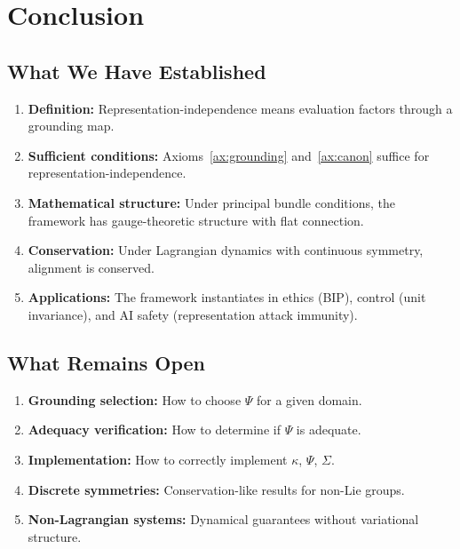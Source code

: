 \documentclass[12pt]{article}
\theoremstyle{definition}
\theoremstyle{remark}
\begin{document}
\section{Conclusion}

\subsection{What We Have Established}

\begin{enumerate}
    \item \textbf{Definition:} Representation-independence means evaluation factors through a grounding
    map.
    \item \textbf{Sufficient conditions:} Axioms~\ref{ax:grounding} and~\ref{ax:canon} suffice for representation-independence.
    \item \textbf{Mathematical structure:} Under principal bundle conditions, the framework has gauge-theoretic structure with flat connection.
    \item \textbf{Conservation:} Under Lagrangian dynamics with continuous symmetry, alignment is
    conserved.
    \item \textbf{Applications:} The framework instantiates in ethics (BIP), control (unit invariance), and
    AI safety (representation attack immunity).
\end{enumerate}

\subsection{What Remains Open}

\begin{enumerate}
    \item \textbf{Grounding selection:} How to choose $\Psi$ for a given domain.
    \item \textbf{Adequacy verification:} How to determine if $\Psi$ is adequate.
    \item \textbf{Implementation:} How to correctly implement $\kappa$, $\Psi$, $\Sigma$.
    \item \textbf{Discrete symmetries:} Conservation-like results for non-Lie groups.
    \item \textbf{Non-Lagrangian systems:} Dynamical guarantees without variational structure.
\end{enumerate}
\end{document}

